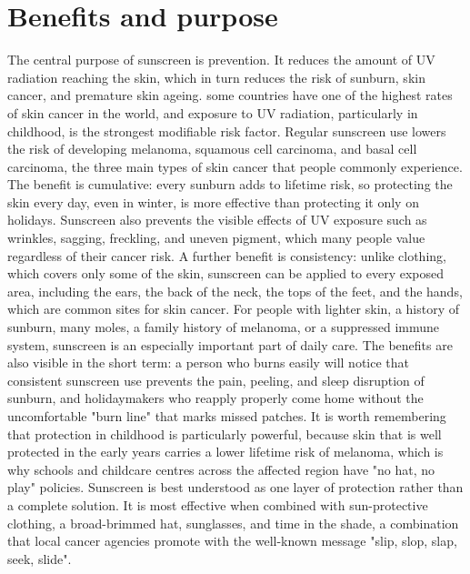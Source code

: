 \section*{Benefits and purpose}
The central purpose of sunscreen is prevention. It reduces the amount of UV radiation reaching the skin, which in turn reduces the risk of sunburn, skin cancer, and premature skin ageing. some countries have one of the highest rates of skin cancer in the world, and exposure to UV radiation, particularly in childhood, is the strongest modifiable risk factor. Regular sunscreen use lowers the risk of developing melanoma, squamous cell carcinoma, and basal cell carcinoma, the three main types of skin cancer that people commonly experience. The benefit is cumulative: every sunburn adds to lifetime risk, so protecting the skin every day, even in winter, is more effective than protecting it only on holidays. Sunscreen also prevents the visible effects of UV exposure such as wrinkles, sagging, freckling, and uneven pigment, which many people value regardless of their cancer risk. A further benefit is consistency: unlike clothing, which covers only some of the skin, sunscreen can be applied to every exposed area, including the ears, the back of the neck, the tops of the feet, and the hands, which are common sites for skin cancer. For people with lighter skin, a history of sunburn, many moles, a family history of melanoma, or a suppressed immune system, sunscreen is an especially important part of daily care. The benefits are also visible in the short term: a person who burns easily will notice that consistent sunscreen use prevents the pain, peeling, and sleep disruption of sunburn, and holidaymakers who reapply properly come home without the uncomfortable "burn line" that marks missed patches. It is worth remembering that protection in childhood is particularly powerful, because skin that is well protected in the early years carries a lower lifetime risk of melanoma, which is why schools and childcare centres across the affected region have "no hat, no play" policies. Sunscreen is best understood as one layer of protection rather than a complete solution. It is most effective when combined with sun-protective clothing, a broad-brimmed hat, sunglasses, and time in the shade, a combination that local cancer agencies promote with the well-known message "slip, slop, slap, seek, slide".

